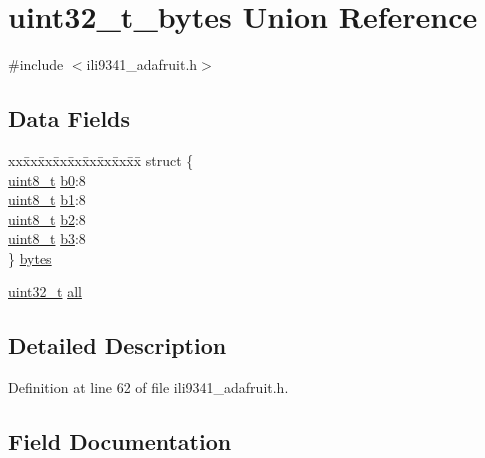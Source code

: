 \hypertarget{unionuint32__t__bytes}{}\section{uint32\+\_\+t\+\_\+bytes Union Reference}
\label{unionuint32__t__bytes}


{\ttfamily \#include $<$ili9341\+\_\+adafruit.\+h$>$}

\subsection*{Data Fields}
\begin{DoxyCompactItemize}
\item 
\begin{tabbing}
xx\=xx\=xx\=xx\=xx\=xx\=xx\=xx\=xx\=\kill
struct \{\\
\>\hyperlink{send_8c_aba7bc1797add20fe3efdf37ced1182c5}{uint8\_t} \hyperlink{unionuint32__t__bytes_a92b86537decb69327191d870f41c60f7}{b0}:8\\
\>\hyperlink{send_8c_aba7bc1797add20fe3efdf37ced1182c5}{uint8\_t} \hyperlink{unionuint32__t__bytes_a91fb31482a2ce44b454fca964dcd556b}{b1}:8\\
\>\hyperlink{send_8c_aba7bc1797add20fe3efdf37ced1182c5}{uint8\_t} \hyperlink{unionuint32__t__bytes_a462312b99de0c6d1c497064902196e1d}{b2}:8\\
\>\hyperlink{send_8c_aba7bc1797add20fe3efdf37ced1182c5}{uint8\_t} \hyperlink{unionuint32__t__bytes_abd7739cae59fab7cf712d53f337b378a}{b3}:8\\
\} \hyperlink{unionuint32__t__bytes_a50aeebe398ee3b740421f1cc8d8583b8}{bytes}\\

\end{tabbing}\item 
\hyperlink{send_8c_a435d1572bf3f880d55459d9805097f62}{uint32\+\_\+t} \hyperlink{unionuint32__t__bytes_a83b0c87830b60d185365dbadf8efd4a0}{all}
\end{DoxyCompactItemize}


\subsection{Detailed Description}


Definition at line 62 of file ili9341\+\_\+adafruit.\+h.



\subsection{Field Documentation}
